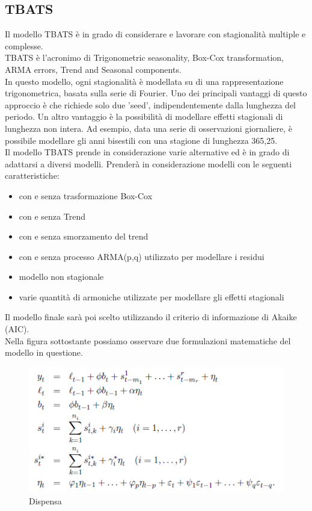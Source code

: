 \documentclass[12pt, a4paper, twocolumn]{article} %
\begin{document}
\subsection{TBATS}
Il modello TBATS è in grado di considerare e lavorare con stagionalità multiple e complesse.\\
TBATS è l'acronimo di Trigonometric seasonality, Box-Cox transformation, ARMA errors, Trend and Seasonal components.\\
In questo modello, ogni stagionalità è modellata su di una rappresentazione trigonometrica, basata sulla serie di Fourier. Uno dei principali vantaggi di questo approccio è che richiede solo due 'seed', indipendentemente dalla lunghezza del periodo. Un altro vantaggio è la possibilità di modellare effetti stagionali di lunghezza non intera. Ad esempio, data una serie di osservazioni giornaliere, è possibile modellare gli anni bisestili con una stagione di lunghezza 365,25.\\
Il modello TBATS prende in considerazione varie alternative ed è in grado di adattarsi a diversi modelli. Prenderà in considerazione modelli con le seguenti caratteristiche:
\begin{itemize}
\item con e senza trasformazione Box-Cox
\item con e senza Trend
\item con e senza smorzamento del trend
\item con e senza processo ARMA(p,q) utilizzato per modellare i residui
\item modello non stagionale
\item varie quantità di armoniche utilizzate per modellare gli effetti stagionali
\end{itemize}
Il modello finale sarà poi scelto utilizzando il criterio di informazione di Akaike (AIC).\\
Nella figura sottostante possiamo osservare due formulazioni matematiche del modello in questione.

\begin{figure}
  \caption{Dispensa}
  \begin{center}
    \includegraphics{tbats.png}
  \end{center}
\end{figure}
\end{document}
